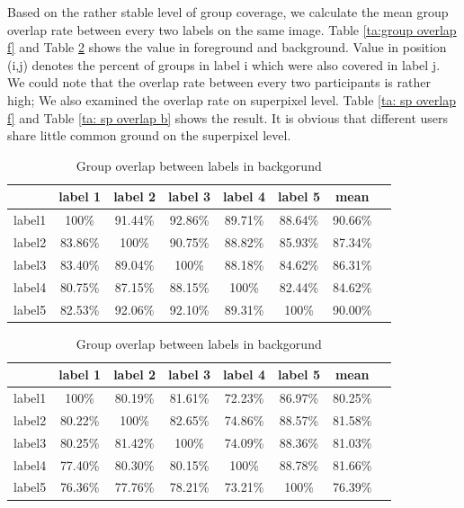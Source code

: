 \documentclass[runningheads,a4paper]{llncs}
\begin{document}
 Based on the rather stable level of group coverage, we calculate the mean group overlap rate between every two labels on the same image. Table \ref{ta:group overlap f} and Table \ref{ta:group overlap b}  shows the value in foreground and background. Value in position (i,j) denotes the percent of groups in label i which were also covered in label j. We could note that the overlap rate between every two participants is rather high; We also examined the overlap rate on superpixel level. Table \ref{ta: sp overlap f} and Table \ref{ta: sp overlap b} shows the result. It is obvious that different users share little common ground on the superpixel level.

\begin{table}
\parbox{.35\linewidth}{
\centering
\begin{tabular}{|c|c|c|c|c|c|c|c|}
\hline
 & label 1 & label 2&label 3&label 4&label 5&mean\\
\hline
label1& 100\% & 91.44\% & 92.86\%& 89.71\%& 88.64\%&90.66\%\\
\hline
label2& 83.86\% & 100\% & 90.75\%& 88.82\%& 85.93\%&87.34\%\\
\hline
label3& 83.40\% & 89.04\% & 100\%& 88.18\%& 84.62\%&86.31\% \\
\hline
label4& 80.75\% & 87.15\% & 88.15\%& 100\%& 82.44\%&84.62\% \\
\hline
label5& 82.53\% & 92.06\% & 92.10\%& 89.31\%& 100\%&90.00\% \\
\hline
\end{tabular}\captionsetup{justification=centerlast}
\caption{Group overlap between labels in foregorund}
\label{ta:group overlap f}
}
\hfill
\parbox{.35\linewidth}{
\centering
\begin{tabular}{|c|c|c|c|c|c|c|c|}
\hline
 & label 1 & label 2&label 3&label 4&label 5&mean\\
\hline
label1& 100\% &80.19\% & 81.61\%& 72.23\%& 86.97\%&80.25\%\\
\hline
label2& 80.22\% & 100\% & 82.65\%& 74.86\%& 88.57\%&81.58\% \\
\hline
label3& 80.25\% & 81.42\% & 100\%& 74.09\%& 88.36\%&81.03\%\\
\hline
label4& 77.40\% & 80.30\% & 80.15\%& 100\%& 88.78\%&81.66\% \\
\hline
label5& 76.36\% & 77.76\% & 78.21\%& 73.21\%& 100\%&76.39\%\\
\hline
\end{tabular}

\captionsetup{justification=centerlast}
\caption{Group overlap between labels in backgorund}
\label{ta:group overlap b}
}
\end{table}
\end{document}
